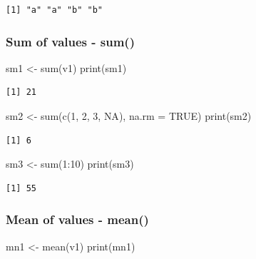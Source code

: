 \documentclass[
  letterpaper,
  DIV=11,
  numbers=noendperiod]{scrartcl}
\newenvironment{Shaded}{\begin{snugshade}}{\end{snugshade}}
\newcommand{\AttributeTok}[1]{\textcolor[rgb]{0.40,0.45,0.13}{#1}}
\newcommand{\ConstantTok}[1]{\textcolor[rgb]{0.56,0.35,0.01}{#1}}
\newcommand{\DecValTok}[1]{\textcolor[rgb]{0.68,0.00,0.00}{#1}}
\newcommand{\FunctionTok}[1]{\textcolor[rgb]{0.28,0.35,0.67}{#1}}
\newcommand{\NormalTok}[1]{\textcolor[rgb]{0.00,0.23,0.31}{#1}}
\newcommand{\OtherTok}[1]{\textcolor[rgb]{0.00,0.23,0.31}{#1}}
\newcommand{\SpecialCharTok}[1]{\textcolor[rgb]{0.37,0.37,0.37}{#1}}
\begin{document}
\begin{verbatim}
[1] "a" "a" "b" "b"
\end{verbatim}

\subsubsection{Sum of values - sum()}\label{sum-of-values---sum}

\begin{Shaded}
\begin{Highlighting}[]
\NormalTok{sm1 }\OtherTok{\textless{}{-}} \FunctionTok{sum}\NormalTok{(v1)}
\FunctionTok{print}\NormalTok{(sm1)}
\end{Highlighting}
\end{Shaded}

\begin{verbatim}
[1] 21
\end{verbatim}

\begin{Shaded}
\begin{Highlighting}[]
\NormalTok{sm2 }\OtherTok{\textless{}{-}} \FunctionTok{sum}\NormalTok{(}\FunctionTok{c}\NormalTok{(}\DecValTok{1}\NormalTok{, }\DecValTok{2}\NormalTok{, }\DecValTok{3}\NormalTok{, }\ConstantTok{NA}\NormalTok{), }\AttributeTok{na.rm =} \ConstantTok{TRUE}\NormalTok{)}
\FunctionTok{print}\NormalTok{(sm2)}
\end{Highlighting}
\end{Shaded}

\begin{verbatim}
[1] 6
\end{verbatim}

\begin{Shaded}
\begin{Highlighting}[]
\NormalTok{sm3 }\OtherTok{\textless{}{-}} \FunctionTok{sum}\NormalTok{(}\DecValTok{1}\SpecialCharTok{:}\DecValTok{10}\NormalTok{)}
\FunctionTok{print}\NormalTok{(sm3)}
\end{Highlighting}
\end{Shaded}

\begin{verbatim}
[1] 55
\end{verbatim}

\subsubsection{Mean of values - mean()}\label{mean-of-values---mean}

\begin{Shaded}
\begin{Highlighting}[]
\NormalTok{mn1 }\OtherTok{\textless{}{-}} \FunctionTok{mean}\NormalTok{(v1)}
\FunctionTok{print}\NormalTok{(mn1)}
\end{Highlighting}
\end{Shaded}
\end{document}
